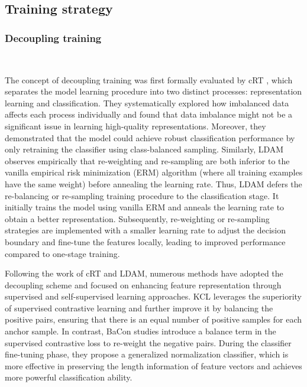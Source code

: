 \subsection{Training strategy}
\label{s33}

\subsubsection{Decoupling training}\
\label{s331}

The concept of decoupling training was first formally evaluated by cRT \cite{kang2019decoupling}, which separates the model learning procedure into two distinct processes: representation learning and classification. They systematically explored how imbalanced data affects each process individually and found that data imbalance might not be a significant issue in learning high-quality representations. Moreover, they demonstrated that the model could achieve robust classification performance by only retraining the classifier using class-balanced sampling. 
Similarly, LDAM \cite{cao2019learning} observes empirically that re-weighting and re-sampling are both inferior to the vanilla empirical risk minimization (ERM) algorithm (where all training examples have the same weight) before annealing the learning rate. Thus, LDAM defers the re-balancing or re-sampling training procedure to the classification stage. It initially trains the model using vanilla ERM and anneals the learning rate to obtain a better representation. Subsequently, re-weighting or re-sampling strategies are implemented with a smaller learning rate to adjust the decision boundary and fine-tune the features locally, leading to improved performance compared to one-stage training.

Following the work of cRT and LDAM, numerous methods have adopted the decoupling scheme and focused on enhancing feature representation through supervised and self-supervised learning approaches.
KCL \cite{kang2021exploring} leverages the superiority of supervised contrastive learning and further improve it by balancing the positive pairs, ensuring that there is an equal number of positive samples for each anchor sample. 
In contrast, BaCon \cite{kang2022comprehensive} studies introduce a balance term in the supervised contrastive loss to re-weight the negative pairs. During the classifier fine-tuning phase, they propose a generalized normalization classifier, which is more effective in preserving the length information of feature vectors and achieves more powerful classification ability.

